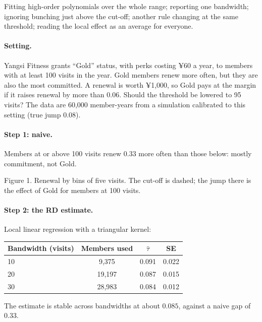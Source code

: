 \documentclass[11pt]{article}
\begin{document}
\begin{pitfall}[RD errors]
Fitting high-order polynomials over the whole range; reporting one bandwidth; ignoring bunching just above the cut-off; another rule changing at the
same threshold; reading the local effect as an average for everyone.
\end{pitfall}


\sectiontwo

\paragraph{Setting.} Yangsi Fitness grants ``Gold'' status, with perks costing ¥60 a year, to members with at least 100 visits in the year. Gold members renew
more often, but they are also the most committed. A renewal is worth ¥1{,}000, so Gold pays at the margin if it raises renewal by more than $0.06$.
Should the threshold be lowered to 95 visits? The data are 60{,}000 member-years from a simulation calibrated to this setting
(true jump $0.08$).

\paragraph{Step 1: naive.} Members at or above 100 visits renew $0.33$ more often than those below: mostly commitment, not Gold.

\begin{center}

\small Figure 1. Renewal by bins of five visits. The cut-off is dashed; the jump there is the effect of Gold for members at 100 visits.
\end{center}

\paragraph{Step 2: the RD estimate.} Local linear regression with a triangular kernel:
\begin{center}
\begin{tabular}{lccc}
\toprule
Bandwidth (visits) & Members used & $\hat\tau$ & SE \\
\midrule
10 & 9{,}375 & 0.091 & 0.022 \\
20 & 19{,}197 & 0.087 & 0.015 \\
30 & 28{,}983 & 0.084 & 0.012 \\
\bottomrule
\end{tabular}
\end{center}
The estimate is stable across bandwidths at about $0.085$, against a naive gap of $0.33$.
\end{document}
